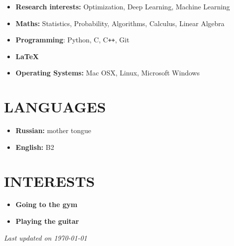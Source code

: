 \documentclass[12pt]{moderncv}
\begin{document}
        \begin{itemize}
            \item \textbf{Research interests:} Optimization, Deep Learning, Machine Learning
            \item \textbf{Maths:} Statistics, Probability, Algorithms, Calculus, Linear Algebra
            \item \textbf{Programming}: Python, C, C\texttt{++}, Git
            \item \textbf{\LaTeX}
            \item \textbf{Operating Systems:} Mac OSX, Linux, Microsoft Windows
        \end{itemize}

    \section{LANGUAGES}

        \begin{itemize}
            \item \textbf{Russian:} mother tongue
            \item \textbf{English:} B2
        \end{itemize}

    \section{INTERESTS}

        \begin{itemize}
            \item \textbf{Going to the gym}
            \item \textbf{Playing the guitar}
        \end{itemize}

    \emptysection{}\closesection{}
    \begin{center}
    \textit{Last updated on \today}
    \end{center}
\end{document}
